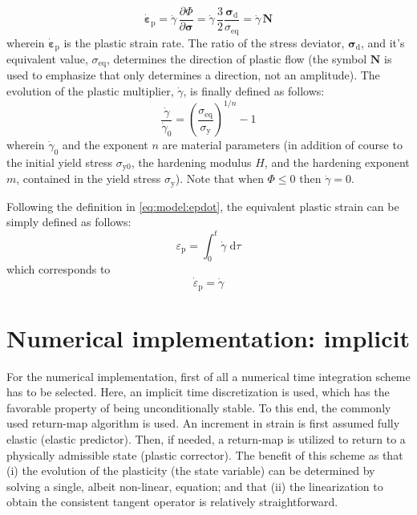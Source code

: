 \documentclass[times,namecite]{goose-article}
\begin{document}
\begin{enumerate}[(i)]
\begin{equation}\label{eq:model:epdot}
  \dot{\bm{\varepsilon}}_\mathrm{p}
  = \dot{\gamma} \, \frac{\partial \Phi}{\partial \bm{\sigma}}
  = \dot{\gamma} \, \frac{3}{2} \frac{\bm{\sigma}_\mathrm{d}}{\sigma_\mathrm{eq}}
  = \dot{\gamma} \, \bm{N}
\end{equation}
wherein $\dot{\bm{\varepsilon}}_\mathrm{p}$ is the plastic strain rate. The ratio of the stress deviator, $\bm{\sigma}_\mathrm{d}$, and it's equivalent value, $\sigma_\mathrm{eq}$, determines the direction of plastic flow (the symbol $\bm{N}$ is used to emphasize that only determines a direction, not an amplitude). The evolution of the plastic multiplier, $\dot{\gamma}$, is finally defined as follows:
\begin{equation}\label{eq:model:gammadot}
  \frac{ \dot{\gamma} }{ \dot{\gamma}_0 }
  =
  \left( \frac{\sigma_\mathrm{eq}}{\sigma_\mathrm{y}} \right)^{1/n} - 1
\end{equation}
wherein $\dot{\gamma}_0$ and the exponent $n$ are material parameters (in addition of course to the initial yield stress $\sigma_\mathrm{y0}$, the hardening modulus $H$, and the hardening exponent $m$, contained in the yield stress $\sigma_\mathrm{y}$). Note that when $\Phi \leq 0$ then $\dot{\gamma} = 0$.

Following the definition in \eqref{eq:model:epdot}, the equivalent plastic strain can be simply defined as follows:
\begin{equation}
  \varepsilon_\mathrm{p} = \int_0^t \dot{\gamma} \; \mathrm{d}\tau
\end{equation}
which corresponds to
\begin{equation}
  \dot{\varepsilon}_\mathrm{p} = \dot{\gamma}
\end{equation}
%
\end{enumerate}

\vfill\newpage
\section{Numerical implementation: implicit}

For the numerical implementation, first of all a numerical time integration scheme has to be selected. Here, an implicit time discretization is used, which has the favorable property of being unconditionally stable. To this end, the commonly used return-map algorithm is used. An increment in strain is first assumed fully elastic (elastic predictor). Then, if needed, a return-map is utilized to return to a physically admissible state (plastic corrector). The benefit of this scheme as that (i) the evolution of the plasticity (the state variable) can be determined by solving a single, albeit non-linear, equation; and that (ii) the linearization to obtain the consistent tangent operator is relatively straightforward.
\end{document}

